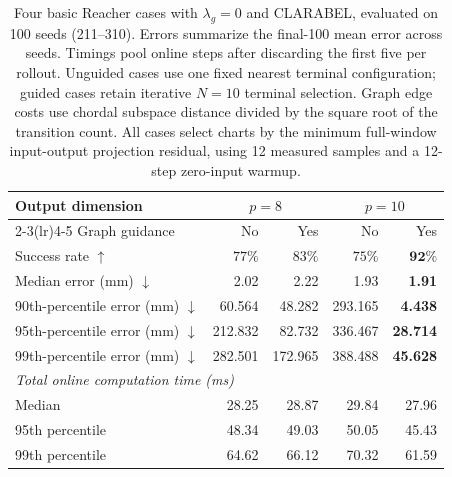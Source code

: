 \begin{table}[htbp]
\centering
\small
\begin{tabular}{lrrrr}
\toprule
Output dimension & \multicolumn{2}{c}{$p=8$} & \multicolumn{2}{c}{$p=10$} \\
\cmidrule(lr){2-3}\cmidrule(lr){4-5}
Graph guidance & No & Yes & No & Yes \\
\midrule
Success rate $\uparrow$ & $77\%$ & $83\%$ & $75\%$ & $\mathbf{92\%}$ \\
Median error (mm) $\downarrow$ & 2.02 & 2.22 & 1.93 & \textbf{1.91} \\
90th-percentile error (mm) $\downarrow$ & 60.564 & 48.282 & 293.165 & \textbf{4.438} \\
95th-percentile error (mm) $\downarrow$ & 212.832 & 82.732 & 336.467 & \textbf{28.714} \\
99th-percentile error (mm) $\downarrow$ & 282.501 & 172.965 & 388.488 & \textbf{45.628} \\
\midrule
\multicolumn{5}{l}{\textit{Total online computation time (ms)}} \\
Median & 28.25 & 28.87 & 29.84 & 27.96 \\
95th percentile & 48.34 & 49.03 & 50.05 & 45.43 \\
99th percentile & 64.62 & 66.12 & 70.32 & 61.59 \\
\bottomrule
\end{tabular}
\caption{Four basic Reacher cases with $\lambda_g=0$ and CLARABEL, evaluated on 100 seeds (211--310). Errors summarize the final-100 mean error across seeds. Timings pool online steps after discarding the first five per rollout. Unguided cases use one fixed nearest terminal configuration; guided cases retain iterative $N=10$ terminal selection. Graph edge costs use chordal subspace distance divided by the square root of the transition count. All cases select charts by the minimum full-window input-output projection residual, using 12 measured samples and a 12-step zero-input warmup.}
\label{tab:basic-cases-clarabel-lamg0}
\end{table}
